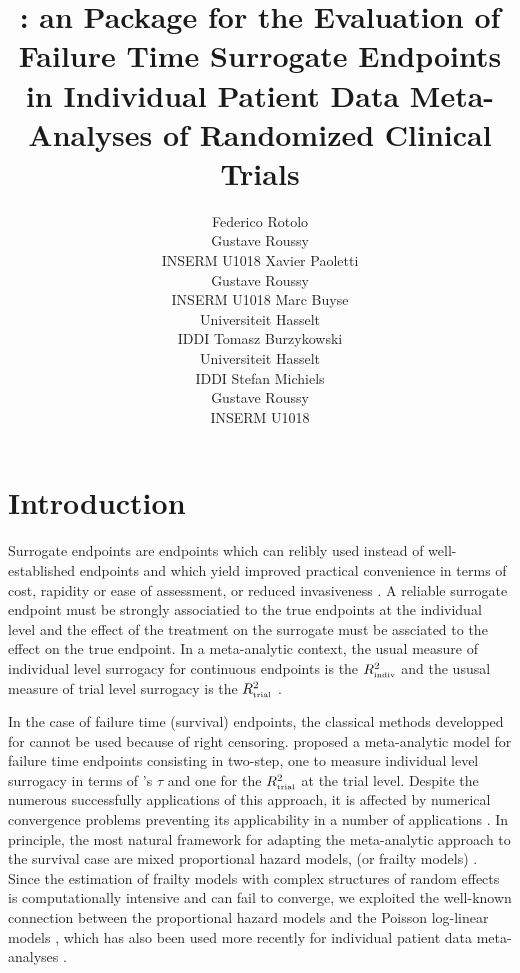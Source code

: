 \documentclass[article,shortnames, nojss]{jss}\usepackage[]{graphicx}\usepackage[]{color}
\author{Federico Rotolo\\Gustave Roussy\\INSERM U1018 \And 
Xavier Paoletti\\Gustave Roussy\\INSERM U1018 \And 
Marc Buyse\\Universiteit Hasselt\\IDDI\AND
Tomasz Burzykowski\\Universiteit Hasselt\\IDDI \And 
Stefan Michiels\\Gustave Roussy\\INSERM U1018}
\title{\pkg{surrosurv}: an \proglang{R} Package for the Evaluation of Failure Time Surrogate Endpoints in Individual Patient Data Meta-Analyses of Randomized Clinical Trials}
\begin{document}

\section{Introduction}

Surrogate endpoints are endpoints which can relibly used instead of well-established endpoints
and which yield improved practical convenience
in terms of cost, rapidity or ease of assessment, 
or reduced invasiveness \citep{Burzykowski2006}.
A reliable surrogate endpoint must be strongly associatied to
the true endpoints at the individual level and
the effect of the treatment on the surrogate
must be assciated to the effect on the true endpoint.
In a meta-analytic context,
the usual measure of individual level surrogacy for continuous endpoints is
the $R^2_\text{\tiny indiv}$ 
and the ususal measure of trial level surrogacy
is the  $R^2_\text{\tiny trial}$ \citep{BuyseEtal00}.

In the case of failure time (survival) endpoints,
the classical methods developped for cannot be used because of right censoring.
\cite{BurzykowskiEtal01} proposed a meta-analytic model
for failure time endpoints consisting in two-step,
one to measure individual level surrogacy in terms of \cite{Kendall38}'s $\tau$
and one for the $R^2_\text{\tiny trial}$ at the trial level.
Despite the numerous successfully applications of this approach,
it is affected by numerical convergence problems
preventing its applicability in a number of applications
\citep{Oba2013, BurzykowskiCortinas05}.
In principle, the most natural framework for adapting the meta-analytic approach
to the survival case are mixed proportional hazard models, (or frailty models)
\citep{DuchateauJanssen08}.
Since the estimation of frailty models with complex
structures of random effects is computationally intensive and can fail to converge,
we exploited
\citep{RotoloPoissurogate}
the well-known connection between the proportional hazard models
and the Poisson log-linear models  \citep{Whitehead80, LairdOlivier81},
which has also been used more recently for individual patient data meta-analyses
\citep{crowtherEtal12}.
\end{document}
